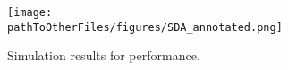 
\begin{figure}[t]
    \centering
    \texttt{[image: \\pathToOtherFiles/figures/SDA\_annotated.png]}
    \caption{Simulation results for performance.}
    \label{fig:performance_results}
\end{figure}




